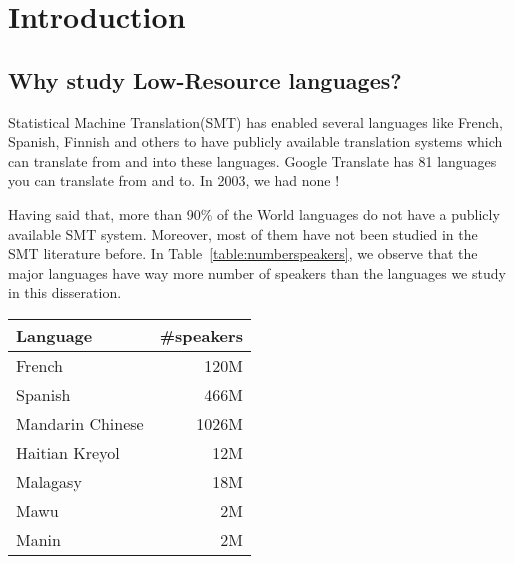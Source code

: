 
%
%

\chapter{Introduction}
\label{sec:introduction}

\section{Why study Low-Resource languages?}
\label{sec:low_resource}

Statistical Machine Translation(SMT) has enabled several languages like French, Spanish, Finnish and others to have publicly available translation systems which can translate from and into these languages. Google Translate has 81 languages you can translate from and to. In 2003, we had none ! 


Having said that, more than 90\% of the World languages do not have a publicly available SMT system. Moreover, most of them have not been studied in the SMT literature before. In Table~\ref{table:numberspeakers}, we observe that the major languages have way more number of speakers than the languages we study in this disseration. 
\begin{table*}
	\begin{tabular}{lr}
	\toprule
	Language & \#speakers \\
	\toprule
	French & 120M \\
	Spanish & 466M \\
	Mandarin Chinese & 1026M \\
	\midrule
	Haitian Kreyol & 12M \\
	Malagasy & 18M \\
	Mawu & 2M \\
	Manin & 2M \\
	\bottomrule
	\end{tabular}
	\caption{Number of speakers for Major and low-resource languages}
	\label{table:numberspeakers}
\end{table*}

